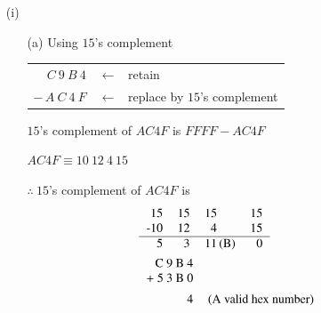 \begin{solution}
\begin{itemize}
\item[(i)]
\begin{itemize}
\item[(a)] Using $15$'s complement
\begin{center}
\begin{tabular}{rl}
$C~9~B~4$ & $\leftarrow$ \ retain\\[3pt]
$-\,A~C~4~F$ & $\leftarrow$ \ replace by $15$'s complement\\
\cline{1-1}
\end{tabular}
\end{center}
\smallskip
$15$'s complement of $AC4F$ is $FFFF-AC4F$

$AC4F\equiv 10 \ 12 \ 4 \ 15$

$\therefore~ 15$'s complement of $AC4F$ is
\begin{align*}
& 
\begin{tabular}{rrr@{\,}lr}
15 & 15 & 15 & & 15\\
-10 & 12 & 4 & & 15\\
\hline
5 & 3 & 11 & (B) & 0
\end{tabular}\\
&
\begin{tabular}{rl}
C~9~B~4 & \\
+~5~3~B~0 & \\
\cline{1-1}
&\\[-7pt]
4 & \text{(A valid hex number)}
\end{tabular}
\end{align*}

\bigskip

\end{itemize}
\end{itemize}
\end{solution}
